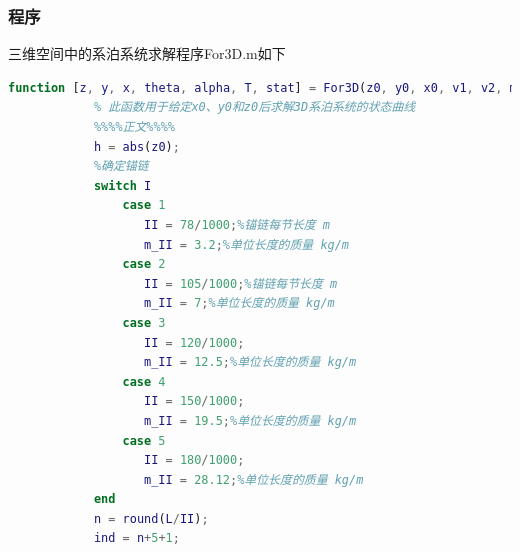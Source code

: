         \subsubsection{程序}
            \par
            三维空间中的系泊系统求解程序For3D.m如下
            \begin{lstlisting}[language = Matlab]
            function [z, y, x, theta, alpha, T, stat] = For3D(z0, y0, x0, v1, v2, m_qiu, I, L, beta, xitong_figure)
            % 此函数用于给定x0、y0和z0后求解3D系泊系统的状态曲线
            %%%%正文%%%%
            h = abs(z0);
            %确定锚链
            switch I
                case 1
                   II = 78/1000;%锚链每节长度 m
                   m_II = 3.2;%单位长度的质量 kg/m
                case 2
                   II = 105/1000;%锚链每节长度 m
                   m_II = 7;%单位长度的质量 kg/m
                case 3
                   II = 120/1000;
                   m_II = 12.5;%单位长度的质量 kg/m
                case 4
                   II = 150/1000;
                   m_II = 19.5;%单位长度的质量 kg/m
                case 5
                   II = 180/1000;
                   m_II = 28.12;%单位长度的质量 kg/m
            end
            n = round(L/II);
            ind = n+5+1;


\end{lstlisting}
